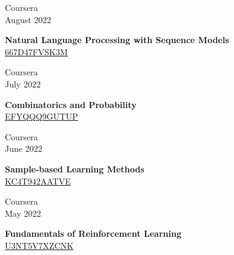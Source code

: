 \documentclass[10pt,a4paper]{article}
\newcommand{\lmpratio}{0.15}
\newcommand{\rmpratio}{0.74}
\newcommand{\horizontalSpace}{0.05\textwidth}
\newcommand{\sectionMain}[1]{\textbf{#1}}
\begin{document}
	\begin{minipage}[t]{\lmpratio\textwidth}
		Coursera\\August 2022
	\end{minipage}
	\hspace{\horizontalSpace}
	\begin{minipage}[t]{\rmpratio\textwidth}
		\sectionMain{Natural Language Processing with Sequence Models}\\
		\href{https://www.coursera.org/account/accomplishments/certificate/667D47FVSK3M}{667D47FVSK3M}
	\end{minipage}
	\vspace{1cm}


	\begin{minipage}[t]{\lmpratio\textwidth}
		Coursera\\July 2022
	\end{minipage}
	\hspace{\horizontalSpace}
	\begin{minipage}[t]{\rmpratio\textwidth}
		\sectionMain{Combinatorics and Probability}\\
		\href{https://www.coursera.org/account/accomplishments/certificate/EFYQQQ9GUTUP}{EFYQQQ9GUTUP}
	\end{minipage}
	\vspace{1cm}

	\begin{minipage}[t]{\lmpratio\textwidth}
		Coursera\\June 2022
	\end{minipage}
	\hspace{\horizontalSpace}
	\begin{minipage}[t]{\rmpratio\textwidth}
		\sectionMain{Sample-based Learning Methods}\\
		\href{https://www.coursera.org/account/accomplishments/certificate/KC4T942AATVE}{KC4T942AATVE}
	\end{minipage}
	\vspace{1cm}

		
	\begin{minipage}[t]{\lmpratio\textwidth}
		Coursera\\May 2022
	\end{minipage}
	\hspace{\horizontalSpace}
	\begin{minipage}[t]{\rmpratio\textwidth}
		\sectionMain{Fundamentals of Reinforcement Learning}\\
		\href{https://www.coursera.org/account/accomplishments/certificate/U3NT5V7XZCNK}{U3NT5V7XZCNK}
	\end{minipage}
	\vspace{1cm}
		
\end{document}
